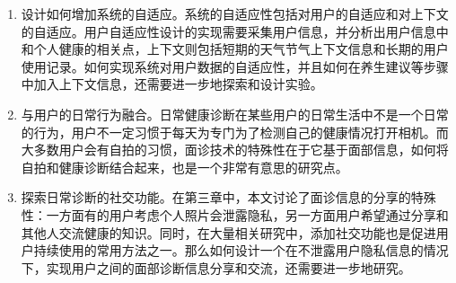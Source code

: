 \begin{enumerate}
	\item 设计如何增加系统的自适应。系统的自适应性包括对用户的自适应和对上下文的自适应。用户自适应性设计的实现需要采集用户信息，并分析出用户信息中和个人健康的相关点，上下文则包括短期的天气节气上下文信息和长期的用户使用记录。如何实现系统对用户数据的自适应性，并且如何在养生建议等步骤中加入上下文信息，还需要进一步地探索和设计实验。

	\item 与用户的日常行为融合。日常健康诊断在某些用户的日常生活中不是一个日常的行为，用户不一定习惯于每天为专门为了检测自己的健康情况打开相机。而大多数用户会有自拍的习惯，面诊技术的特殊性在于它基于面部信息，如何将自拍和健康诊断结合起来，也是一个非常有意思的研究点。

	\item 探索日常诊断的社交功能。在第三章中，本文讨论了面诊信息的分享的特殊性：一方面有的用户考虑个人照片会泄露隐私，另一方面用户希望通过分享和其他人交流健康的知识。同时，在大量相关研究中，添加社交功能也是促进用户持续使用的常用方法之一。那么如何设计一个在不泄露用户隐私信息的情况下，实现用户之间的面部诊断信息分享和交流，还需要进一步地研究。
	
\end{enumerate}